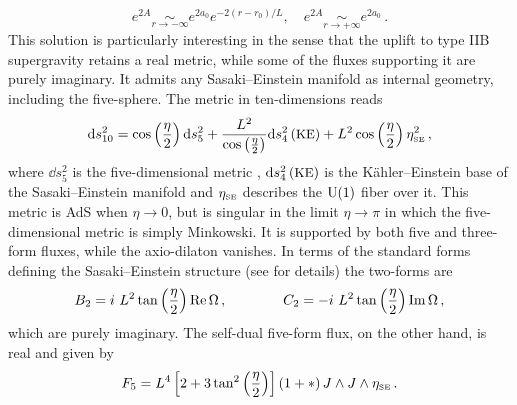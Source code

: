 \begin{enumerate}
\begin{equation}
	e^{2A} \underset{r\to-\infty}{\sim} e^{2a_0}e^{-2(r-r_0)/L},\quad e^{2A} \underset{r\to +\infty}{\sim} e^{2a_0}\,.
\end{equation}
This solution is particularly interesting in the sense that the uplift to type IIB supergravity \cite{Gubser:2009qm,Cassani:2010uw,Gauntlett:2010vu} retains a real metric, while some of the fluxes supporting it are purely imaginary.
It admits any Sasaki--Einstein manifold as internal geometry, including the five-sphere.
The metric in ten-dimensions reads 
\begin{align}
\mathrm{d} s^2_{10}=\cos\left(\frac{\eta}{2}\right)\mathrm{d} s_5^2+\frac{L^2}{\cos\left(\frac{\eta}{2}\right)}\mathrm{d} s_4^2\left(\text{\small KE}\right)+L^2\cos\left(\frac{\eta}{2}\right)\eta_{\text{\tiny SE}}^2\,,
\end{align}
where $\dd s_5^2$ is the five-dimensional metric , $\mathrm{d} s_4^2\left(\text{\small KE}\right)$ is the K\"ahler--Einstein base of the Sasaki--Einstein manifold and $\eta_{\text{\tiny SE}}$ describes the $\mathrm{U}(1)$ fiber over it.
This metric is AdS when $\eta\to0$, but is singular in the limit $\eta\to \pi$ in which the five-dimensional metric is simply Minkowski.
It is supported by both five and three-form fluxes, while the axio-dilaton vanishes.
In terms of the standard forms defining the Sasaki--Einstein structure (see \cite{Gubser:2009qm,Cassani:2010uw,Gauntlett:2010vu} for details) the two-forms are
\begin{align}
B_2=i\,\, L^2\tan\left(\frac{\eta}{2}\right)\operatorname{Re}\Omega\,,\qquad\qquad C_2=-i\,\,L^2\tan\left(\frac{\eta}{2}\right)\operatorname{Im}\Omega\,,
\end{align}
which are purely imaginary.
The self-dual five-form flux, on the other hand, is real and given by
\begin{align}
F_5=L^4\left[2+3\tan^2\left(\frac{\eta}{2}\right)\right]\left(1+*\right)J\wedge J\wedge\eta_{\text{\tiny SE}}\,.
\end{align}


\end{enumerate}

